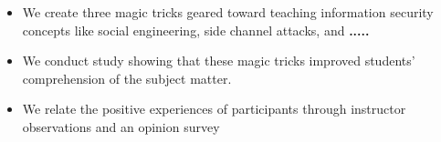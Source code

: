 \begin{itemize}

\item{We create three magic tricks geared toward teaching
information security concepts like social engineering, side channel attacks, and
\textbf{.....}}

\item{We conduct study showing that these magic tricks improved students'
comprehension of the subject matter.}

\item{We relate the positive experiences of participants through instructor
observations and an opinion survey}

\end{itemize}
